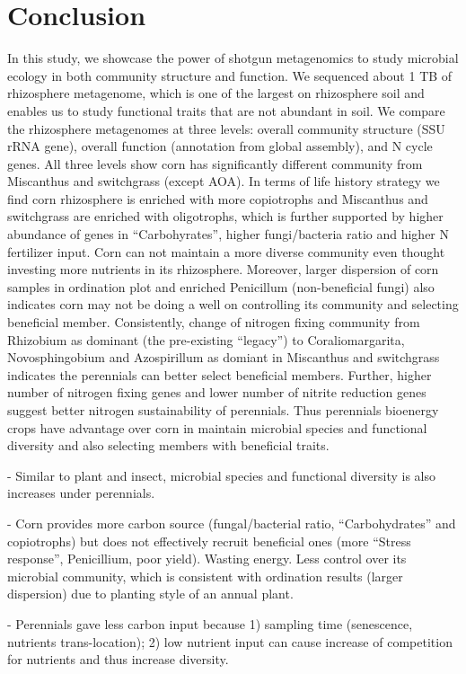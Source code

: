 \documentclass[12pt]{article}
\begin{document}
\section{Conclusion}
In this study, we showcase the power of shotgun metagenomics to study microbial ecology in both community structure and function. We sequenced about 1 TB of rhizosphere metagenome, which is one of the largest on rhizosphere soil and enables us to study functional traits that are not abundant in soil. We compare the rhizosphere metagenomes at three levels: overall community structure (SSU rRNA gene), overall function (annotation from global assembly), and N cycle genes. All three levels show corn has significantly different community from Miscanthus and switchgrass (except AOA). In terms of life history strategy we find corn rhizosphere is enriched with more copiotrophs and Miscanthus and switchgrass are enriched with oligotrophs, which is further supported by higher abundance of genes in ``Carbohyrates'', higher fungi/bacteria ratio and higher N fertilizer input. Corn can not maintain a more diverse community even thought investing more nutrients in its rhizosphere. Moreover, larger dispersion of corn samples in ordination plot and enriched Penicillum (non-beneficial fungi) also indicates corn may not be doing a well on controlling its community and selecting beneficial member. Consistently, change of nitrogen fixing community from Rhizobium as dominant (the pre-existing ``legacy'')  to Coraliomargarita, Novosphingobium and Azospirillum as domiant in Miscanthus and switchgrass indicates the perennials can better select beneficial members. Further, higher number of nitrogen fixing genes and lower number of nitrite reduction genes suggest better nitrogen sustainability of perennials. Thus perennials bioenergy crops have advantage over corn in maintain microbial species and functional diversity and also selecting members with beneficial traits.


- Similar to plant and insect, microbial species and functional diversity is also increases under perennials.
 
- Corn provides more carbon source (fungal/bacterial ratio, ``Carbohydrates'' and copiotrophs) but does not effectively recruit beneficial ones (more ``Stress response'', Penicillium, poor yield). Wasting energy. Less control over its microbial community, which is consistent with ordination results (larger dispersion) due to planting style of an annual plant.

- Perennials gave less carbon input because 1) sampling time (senescence, nutrients trans-location); 2) low nutrient input can cause increase of competition for nutrients and thus increase diversity.
\end{document}
